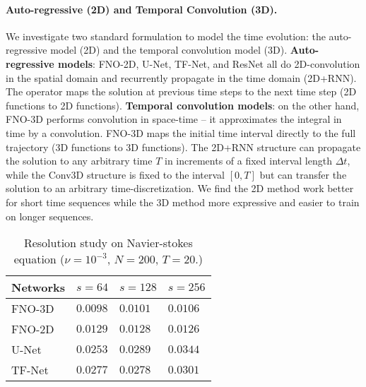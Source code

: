 \paragraph{Auto-regressive (2D) and Temporal Convolution (3D).}
We investigate two standard formulation to model the time evolution: the auto-regressive model (2D) and the temporal convolution model (3D).
\textbf{Auto-regressive models}: FNO-2D, U-Net, TF-Net, and ResNet all do 2D-convolution in the spatial domain and recurrently propagate in the time domain (2D+RNN). The operator maps the solution at previous time steps to the next time step (2D functions to 2D functions). 
\textbf{Temporal convolution models}: on the other hand, FNO-3D performs convolution in space-time -- it approximates the integral in time by a convolution. FNO-3D maps the initial time interval  directly to the full trajectory (3D functions to 3D functions). 
The 2D+RNN structure can propagate the solution to any arbitrary time $T$ in increments of a fixed interval length $\Delta t$, while the Conv3D structure is fixed to the interval $[0, T]$ but can transfer the solution to an arbitrary time-discretization. We find the 2D method work better for short time sequences while the 3D  method more expressive and easier to train on longer sequences.  



\begin{table}[ht]

\begin{center}
\begin{tabular}{l|lll}
\multicolumn{1}{c}{\bf Networks}
&\multicolumn{1}{c}{\bf $s=64$}
&\multicolumn{1}{c}{\bf $s=128$}
&\multicolumn{1}{c}{\bf $s=256$}\\
\hline 
FNO-3D    & $0.0098$ & $0.0101$ &$0.0106$  \\
FNO-2D    & $0.0129$ & $0.0128$ &$0.0126$ \\
U-Net       & $0.0253$ & $0.0289$ &$0.0344$ \\
TF-Net       & $0.0277$ & $0.0278$ &$0.0301$ \\
\hline 
\end{tabular}
\end{center}

\caption{ Resolution study on Navier-stokes equation ($\nu=10^{-3}$, $N=200$, $T=20$.)} 
\label{table:nse}
\end{table}

